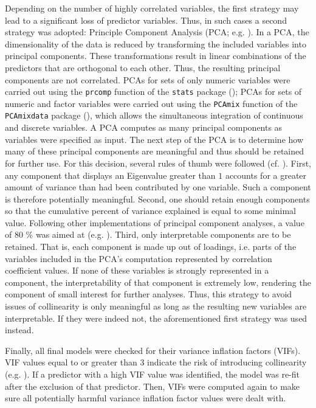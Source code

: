 Depending on the number of highly correlated variables, the first strategy may lead to a significant loss of predictor variables. Thus, in such cases a second strategy was adopted: Principle Component Analysis (PCA; e.g. \cite{Venables2002, Baayen2008, Tomaschek2018collin}). In a PCA, the dimensionality of the data is reduced by transforming the included variables into principal components. These transformations result in linear combinations of the predictors that are orthogonal to each other. Thus, the resulting principal components are not correlated. PCAs for sets of only numeric variables were carried out using the \texttt{prcomp} function of the \texttt{stats} package (\cite{RCore2020}); PCAs for sets of numeric and factor variables were carried out using the \texttt{PCAmix} function of the \texttt{PCAmixdata} package (\cite{Chavent2017}), which allows the simultaneous integration of continuous and discrete variables. A PCA computes as many principal components as variables were specified as input. The next step of the PCA is to determine how many of these principal components are meaningful and thus should be retained for further use. For this decision, several rules of thumb were followed (cf. \cite{ORourke2005, Baayen2008}). First, any component that displays an Eigenvalue greater than $1$ accounts for a greater amount of variance than had been contributed by one variable. Such a component is therefore potentially meaningful. Second, one should retain enough components so that the cumulative percent of variance explained is equal to some minimal value. Following other implementations of principal component analyses, a value of 80 \% was aimed at (e.g. \cite{ORourke2005}). Third, only interpretable components are to be retained. That is, each component is made up out of loadings, i.e. parts of the variables included in the PCA’s computation represented by correlation coefficient values. If none of these variables is strongly represented in a component, the interpretability of that component is extremely low, rendering the component of small interest for further analyses. Thus, this strategy to avoid issues of collinearity is only meaningful as long as the resulting new variables are interpretable. If they were indeed not, the aforementioned first strategy was used instead.

Finally, all final models were checked for their variance inflation factors (VIFs). VIF values equal to or greater than $3$ indicate the risk of introducing collinearity (e.g. \cite{Zuur2010}). If a predictor with a high VIF value was identified, the model was re-fit after the exclusion of that predictor. Then, VIFs were computed again to make sure all potentially harmful variance inflation factor values were dealt with. 

